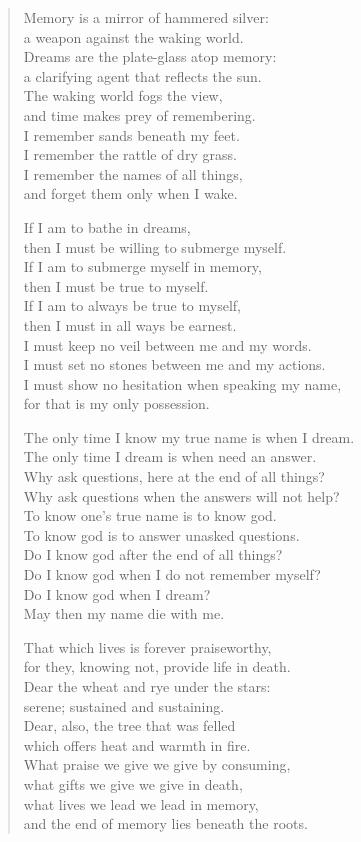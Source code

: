 \begin{quote}
Memory is a mirror of hammered silver:\\
a weapon against the waking world.\\
Dreams are the plate-glass atop memory:\\
a clarifying agent that reflects the sun.\\
The waking world fogs the view,\\
and time makes prey of remembering.\\
I remember sands beneath my feet.\\
I remember the rattle of dry grass.\\
I remember the names of all things,\\
and forget them only when I wake.

If I am to bathe in dreams,\\
then I must be willing to submerge myself.\\
If I am to submerge myself in memory,\\
then I must be true to myself.\\
If I am to always be true to myself,\\
then I must in all ways be earnest.\\
I must keep no veil between me and my words.\\
I must set no stones between me and my actions.\\
I must show no hesitation when speaking my name,\\
for that is my only possession.

The only time I know my true name is when I dream.\\
The only time I dream is when need an answer.\\
Why ask questions, here at the end of all things?\\
Why ask questions when the answers will not help?\\
To know one's true name is to know god.\\
To know god is to answer unasked questions.\\
Do I know god after the end of all things?\\
Do I know god when I do not remember myself?\\
Do I know god when I dream?\\
May then my name die with me.

That which lives is forever praiseworthy,\\
for they, knowing not, provide life in death.\\
Dear the wheat and rye under the stars:\\
serene; sustained and sustaining.\\
Dear, also, the tree that was felled\\
which offers heat and warmth in fire.\\
What praise we give we give by consuming,\\
what gifts we give we give in death,\\
what lives we lead we lead in memory,\\
and the end of memory lies beneath the roots.


\end{quote}
